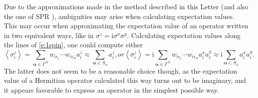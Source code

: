 \documentclass[aps,prl,showpacs,amsmath,amssymb,superscriptaddress,reprint,10pt]{revtex4-1}
\newcommand\ii{{\mathrm{i}}}
\newcommand{\mvec}[1]{\boldsymbol #1}
\begin{document}
Due to the approximations made in the method described in this Letter (and also the one of SPR \cite{Schachenmayer_etal15}), ambiguities may arise when calculating expectation values. This may occur when approximating the expectation value of an operator written in two equivalent ways, like in $\sigma^z=\ii\sigma^x\sigma^y$. Calculating expectation values along the lines of \eqref{e:1spin}, one could compute either
\begin{subequations}
\begin{equation}
\left\langle\sigma_i^z\right\rangle =\sum_{\mvec{\alpha}\in\Gamma^N}w_{\alpha_1}\cdots w_{\alpha_N} a_i^z \approx \sum_{\mvec{\alpha}\in S_n}a_i^z,
\end{equation}
or
\begin{equation}
\left\langle\sigma_i^z\right\rangle =\ii\sum_{\mvec{\alpha}\in\Gamma^N}w_{\alpha_1}\cdots w_{\alpha_N} a_i^x a_i^y \approx \ii\sum_{\mvec{\alpha}\in S_n}a_i^x a_i^y.
\end{equation}
\end{subequations}
The latter does not seem to be a reasonable choice though, as the expectation value of a Hermitian operator calculated this way turns out to be imaginary, and it appears favorable to express an operator in the simplest possible way.
\end{document}
